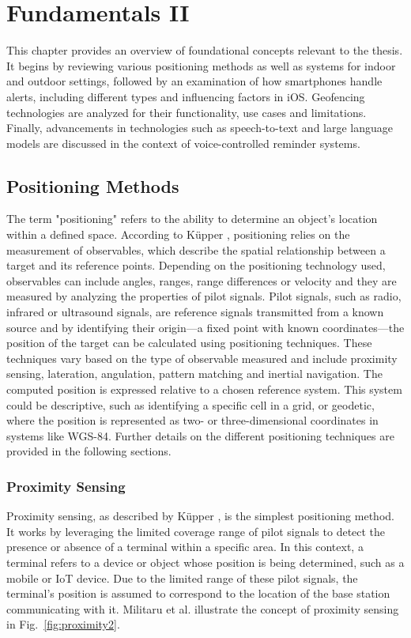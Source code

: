 \chapter{Fundamentals II}
\label{cha:Fundamentals II}

This chapter provides an overview of foundational concepts relevant to the thesis. It begins by reviewing various positioning methods as well as systems for indoor and outdoor settings, followed by an examination of how smartphones handle alerts, including different types and influencing factors in iOS. Geofencing technologies are analyzed for their functionality, use cases and limitations. Finally, advancements in technologies such as speech-to-text and large language models are discussed in the context of voice-controlled reminder systems.

\section{Positioning Methods}
The term "positioning" refers to the ability to determine an object's location within a defined space. According to K\"upper \cite{kupper2005location}, positioning relies on the measurement of observables, which describe the spatial relationship between a target and its reference points. Depending on the positioning technology used, observables can include angles, ranges, range differences or velocity and they are measured by analyzing the properties of pilot signals. 
Pilot signals, such as radio, infrared or ultrasound signals, are reference signals transmitted from a known source and by identifying their origin—a fixed point with known coordinates—the position of the target can be calculated using positioning techniques. These techniques vary based on the type of observable measured and include proximity sensing, lateration, angulation, pattern matching and inertial navigation.
The computed position is expressed relative to a chosen reference system. This system could be descriptive, such as identifying a specific cell in a grid, or geodetic, where the position is represented as two- or three-dimensional coordinates in systems like WGS-84. Further details on the different positioning techniques are provided in the following sections.

\subsection{Proximity Sensing}
Proximity sensing, as described by K\"upper \cite{kupper2005location}, is the simplest positioning method.
It works by leveraging the limited coverage range of pilot signals to detect the presence or absence of a terminal within a specific area. 
In this context, a terminal refers to a device or object whose position is being determined, such as a mobile or IoT device.
Due to the limited range of these pilot signals, the terminal's position is assumed to correspond to the location of the base station communicating with it.
Militaru et al. \cite{militaru2024positioning} illustrate the concept of proximity sensing in Fig.~\ref{fig:proximity2}.

